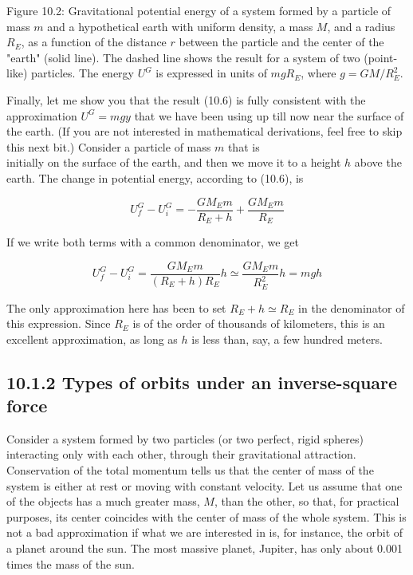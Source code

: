 \documentclass[10pt]{article}
\begin{document}
Figure 10.2: Gravitational potential energy of a system formed by a particle of mass $m$ and a hypothetical earth with uniform density, a mass $M$, and a radius $R_{E}$, as a function of the distance $r$ between the particle and the center of the "earth" (solid line). The dashed line shows the result for a system of two (point-like) particles. The energy $U^{G}$ is expressed in units of $m g R_{E}$, where $g=G M / R_{E}^{2}$.

Finally, let me show you that the result (10.6) is fully consistent with the approximation $U^{G}=m g y$ that we have been using up till now near the surface of the earth. (If you are not interested in mathematical derivations, feel free to skip this next bit.) Consider a particle of mass $m$ that is\\
initially on the surface of the earth, and then we move it to a height $h$ above the earth. The change in potential energy, according to (10.6), is


\begin{equation*}
U_{f}^{G}-U_{i}^{G}=-\frac{G M_{E} m}{R_{E}+h}+\frac{G M_{E} m}{R_{E}} \tag{10.9}
\end{equation*}


If we write both terms with a common denominator, we get


\begin{equation*}
U_{f}^{G}-U_{i}^{G}=\frac{G M_{E} m}{\left(R_{E}+h\right) R_{E}} h \simeq \frac{G M_{E} m}{R_{E}^{2}} h=m g h \tag{10.10}
\end{equation*}


The only approximation here has been to set $R_{E}+h \simeq R_{E}$ in the denominator of this expression. Since $R_{E}$ is of the order of thousands of kilometers, this is an excellent approximation, as long as $h$ is less than, say, a few hundred meters.

\subsection*{10.1.2 Types of orbits under an inverse-square force}
Consider a system formed by two particles (or two perfect, rigid spheres) interacting only with each other, through their gravitational attraction. Conservation of the total momentum tells us that the center of mass of the system is either at rest or moving with constant velocity. Let us assume that one of the objects has a much greater mass, $M$, than the other, so that, for practical purposes, its center coincides with the center of mass of the whole system. This is not a bad approximation if what we are interested in is, for instance, the orbit of a planet around the sun. The most massive planet, Jupiter, has only about 0.001 times the mass of the sun.
\end{document}
